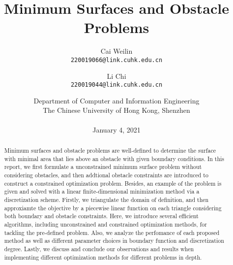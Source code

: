 \documentclass[11pt]{article}
\begin{document}
\title{Minimum Surfaces and Obstacle Problems}


\author{
	Cai Weilin \\
	\texttt{220019066@link.cuhk.edu.cn} \\
	\and
	Li Chi \\
	\texttt{220019044@link.cuhk.edu.cn} \\
	\and
	Department of Computer and Information Engineering\\
	The Chinese University of Hong Kong, Shenzhen \\ \\
	January 4, 2021
}

\maketitle

\small


\begin{abstract}
Minimum surfaces and obstacle problems are well-defined to determine the surface with minimal area that lies above an obstacle with given boundary conditions. In this report, we first formulate a unconstrained minimum surface problem without considering obstacles, and then addtional obstacle constraints are introduced to construct a constrained optimization problem. Besides, an example of the problem is given and solved with a linear finite-dimensional minimization method via a discretization scheme. Firstly, we triangulate the domain of definition, and then approxiamte the objective by a piecewise linear function on each triangle considering both boundary and obstacle constraints. Here, we introduce several efficient algorithms, including unconstrained and constrained optimization methods, for tackling the pre-defined problem. Also, we analyze the perfomance of each proposed method as well as different parameter choices in boundary function and discretization degree. Lastly, we discuss and conclude our observations and results when implementing different optimization methods for different problems in depth.

\end{abstract}












\end{document}
